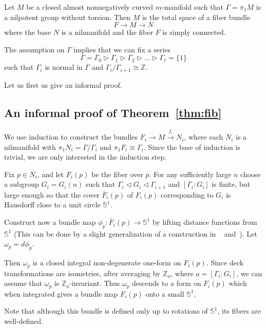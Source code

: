 \documentclass{amsart}
\begin{document}
\begin{thm}\label{thm:fib}

Let $M$ be a closed almost nonnegatively curved $m$-manifold
such that $\Gamma=\pi_1M$ is a nilpotent group without torsion.
Then  $M$
is the total space of a fiber bundle
$$
 F\to M\to N
$$
where the base $N$ is a nilmanifold and the fiber $F$ is simply connected.
\end{thm}

The assumption on $\Gamma$ implies that
we can fix a series
$$\Gamma=\Gamma_0\rhd\Gamma_1\rhd\Gamma_2\rhd\ldots\rhd\Gamma_\ell=\{1\}$$
such that $\Gamma_i$ is normal in $\Gamma$ and $\Gamma_i/\Gamma_{i+1}\cong \mathbb{Z}$.

Let us first us give an informal proof.

\subsection{An informal proof of Theorem~\ref{thm:fib}}
We use induction to construct the bundles
$F_i\longrightarrow M\overset{f_i}{\longrightarrow} N_i$, where each $N_i$ is a
nilmanifold with $\pi_1N_i=\Gamma/\Gamma_i$
and $\pi_1F_i\cong \Gamma_i$.
Since the base of induction is trivial,
we are only interested in the induction step.

Fix $p\in N_i$,
and let $F_i(p)$ be the fiber over $p$.
For any sufficiently large $n$
choose a subgroup $G_i=G_i(n)$
such that $\Gamma_{i}\lhd G_i\lhd \Gamma_{i+1}$ and
$[\Gamma_i: G_i]$ is finite,
but large enough so that the cover
$\bar{F}_i(p)$ of $F_i(p)$
corresponding to $G_i$ is Hausdorff close to a unit circle $\mathbb{S}^{1}$.


Construct now a bundle map $\phi_p\colon \bar F_i(p)\to \mathbb{S}^{1}$
by lifting distance functions from $\mathbb{S}^{1}$
(This can be done by a slight generalization
of a construction in ~\cite{FY}  and~\cite{BGP}).
Let $\omega_p=d\phi_p$.

Then $\omega_p$
is a closed integral non-degenerate one-form on $F_i(p)$.
Since deck transformations are isometries,
after  averaging by $\mathbb{Z}_a$, where $a= [\Gamma_i: G_i]$,
we can assume that
$\omega_p$ is $\mathbb{Z}_a$-invariant.
Thus $\omega_p$ descends to a form on $F_i(p)$
which when integrated gives a bundle map $F_i(p)$ onto a small $\mathbb{S}^{1}$.

Note that although this bundle is defined only up to rotations of $\mathbb{S}^{1}$,
its fibers are well-defined.
\end{document}
